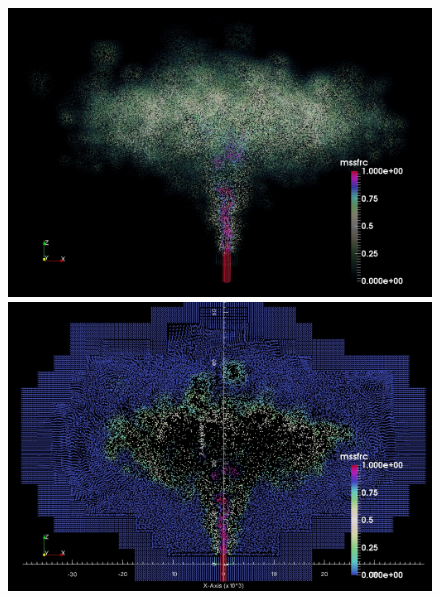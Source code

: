 \documentclass[gmd, manuscript]{copernicus} %
\providecommand{\DIFaddbegin}{} %
\providecommand{\DIFdelbegin}{} %
\providecommand{\DIFdelend}{} %
\begin{document}
\DIFdelbegin %
\DIFdelend \DIFaddbegin \begin{figure}[!htb]
    \centering
    \begin{minipage}{.45\textwidth}
        \centering
        \includegraphics[width=0.99 \textwidth]{./mssfrc-Diverging}
    \end{minipage}%
    \begin{minipage}{.45 \textwidth}
        \centering
        \includegraphics[width=0.99 \textwidth]{./mssfrc-Diverging-cut}
    \end{minipage}%
    \\
    \begin{minipage}{.45 \textwidth}
        \centering

\end{minipage}
\end{figure}
\end{document}
